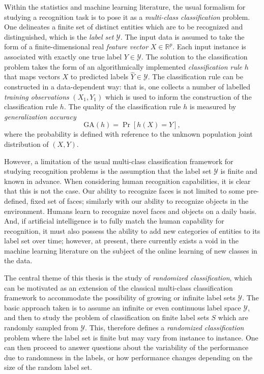 Within the statistics and machine learning literature, the usual
formalism for studying a recognition task is to pose it as a
\emph{multi-class classification} problem.  One delineates a finite
set of distinct entities which are to be recognized and distinguished,
which is the \emph{label set} $\mathcal{Y}$.  The input data is
assumed to take the form of a finite-dimensional real \emph{feature
  vector} $X \in \mathbb{R}^p$.  Each input instance is associated
with exactly one true label $Y \in \mathcal{Y}$.  The solution to the
classification problem takes the form of an algorithmically
implemented \emph{classification rule} $h$ that maps vectors $X$ to
predicted labels $\hat{Y} \in \mathcal{Y}$.  The classification rule
can be constructed in a data-dependent way: that is, one collects a
number of labelled \emph{training observations} $(X_1, Y_1)$ which is
used to inform the construction of the classification rule $h$.  The
quality of the classification rule $h$ is measured by \emph{generalization accuracy}
\[
\text{GA}(h) = \Pr[h(X) = Y],
\]
where the probability is defined with reference to the unknown
population joint distribution of $(X, Y)$.  

However, a limitation of the usual multi-class classification
framework for studying recognition problems is the assumption that the
label set $\mathcal{Y}$ is finite and known in advance.  When
considering human recognition capabilities, it is clear that this is
not the case.  Our ability to recognize faces is not limited to some
pre-defined, fixed set of faces; similarly with our ability to recognize
objects in the environment.  Humans learn to recognize novel faces and
objects on a daily basis.  And, if artificial intelligence is to fully
match the human capability for recognition, it must also possess the
ability to add new categories of entities to its label set over time;
however, at present, there currently exists a void in the machine
learning literature on the subject of the online learning of new
classes in the data.

The central theme of this thesis is the study of \emph{randomized
  classification}, which can be motivated as an extension of the
classical multi-class classification framework to accommodate the
possibility of growing or infinite label sets $\mathcal{Y}$. The basic
approach taken is to assume an infinite or even continuous label space
$\mathcal{Y}$, and then to study the problem of classification on
finite label sets $S$ which are randomly sampled from $\mathcal{Y}.$
This, therefore defines a \emph{randomized classification} problem
where the label set is finite but may vary from instance to instance.
One can then proceed to answer questions about the variability of the
performance due to randomness in the labels, or how performance
changes depending on the size of the random label set.

